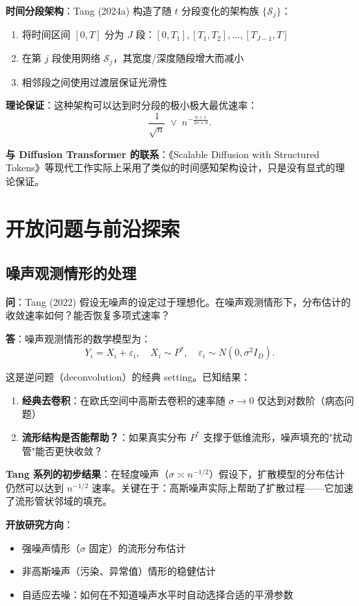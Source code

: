\textbf{时间分段架构}：Tang (2024a) 构造了随 $t$ 分段变化的架构族 $\{\mathcal{S}_j\}$：
\begin{enumerate}
    \item 将时间区间 $[0, T]$ 分为 $J$ 段：$[0, T_1], [T_1, T_2], \ldots, [T_{J-1}, T]$
    \item 在第 $j$ 段使用网络 $\mathcal{S}_j$，其宽度/深度随段增大而减小
    \item 相邻段之间使用过渡层保证光滑性
\end{enumerate}

\textbf{理论保证}：这种架构可以达到时分段的极小极大最优速率：
\[
\frac{1}{\sqrt{n}} \;\vee\; n^{-\frac{\alpha+1}{2\alpha+d}}.
\]

\textbf{与 Diffusion Transformer 的联系}：《Scalable Diffusion with Structured Tokens》等现代工作实际上采用了类似的时间感知架构设计，只是没有显式的理论保证。

\section{开放问题与前沿探索}

\subsection{噪声观测情形的处理}\label{sec:qa-noise-observation}

\textbf{问}：Tang (2022) 假设无噪声的设定过于理想化。在噪声观测情形下，分布估计的收敛速率如何？能否恢复多项式速率？

\textbf{答}：噪声观测情形的数学模型为：
\[
Y_i = X_i + \varepsilon_i, \quad X_i \sim P^*, \quad \varepsilon_i \sim N(0, \sigma^2 I_D).
\]

这是逆问题（deconvolution）的经典 setting。已知结果：
\begin{enumerate}
    \item \textbf{经典去卷积}：在欧氏空间中高斯去卷积的速率随 $\sigma \to 0$ 仅达到对数阶（病态问题）
    \item \textbf{流形结构是否能帮助？}：如果真实分布 $P^*$ 支撑于低维流形，噪声填充的"扰动管"能否更快收敛？
\end{enumerate}

\textbf{Tang 系列的初步结果}：在轻度噪声（$\sigma \asymp n^{-1/2}$）假设下，扩散模型的分布估计仍然可以达到 $n^{-1/2}$ 速率。关键在于：高斯噪声实际上帮助了扩散过程——它加速了流形管状邻域的填充。

\textbf{开放研究方向}：
\begin{itemize}
    \item 强噪声情形（$\sigma$ 固定）的流形分布估计
    \item 非高斯噪声（污染、异常值）情形的稳健估计
    \item 自适应去噪：如何在不知道噪声水平时自动选择合适的平滑参数
\end{itemize}

